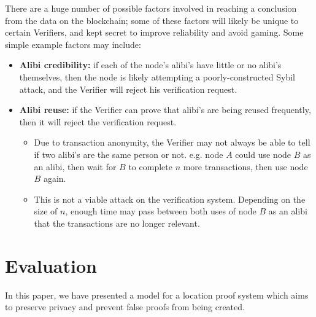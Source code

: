 \documentclass[12pt]{article}
\begin{document}
There are a huge number of possible factors involved in reaching a conclusion from the data on the blockchain; some of these factors will likely be unique to certain Verifiers, and kept secret to improve reliability and avoid gaming. Some simple example factors may include:
\begin{itemize}
	\item \textbf{Alibi credibility:} if each of the node’s alibi’s have little or no alibi’s themselves, then the node is likely attempting a poorly-constructed Sybil attack, and the Verifier will reject his verification request.
	\item \textbf{Alibi reuse:} if the Verifier can prove that alibi’s are being reused frequently, then it will reject the verification request.
	\begin{itemize}
		\item Due to transaction anonymity, the Verifier may not always be able to tell if two alibi's are the same person or not. e.g. node $A$ could use node $B$ as an alibi, then wait for $B$ to complete $n$ more transactions, then use node $B$ again.
		\item This is not a viable attack on the verification system. Depending on the size of $n$, enough time may pass between both uses of node $B$ as an alibi that the transactions are no longer relevant.
	\end{itemize}
\end{itemize}

\newpage
\section{Evaluation}
In this paper, we have presented a model for a location proof system which aims to preserve privacy and prevent false proofs from being created.
\end{document}
